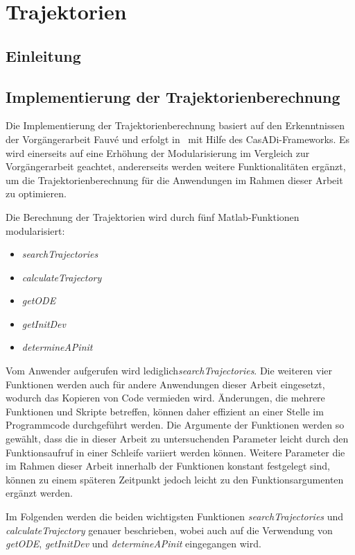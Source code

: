 \chapter{Trajektorien}\label{cha:trj}

\section{Einleitung}

\section{Implementierung der Trajektorienberechnung}

Die Implementierung der Trajektorienberechnung basiert auf den Erkenntnissen der Vorgängerarbeit Fauvé \cite{fauve} und erfolgt in \Matlab\ mit Hilfe des CasADi-Frameworks. Es wird einerseits auf eine Erhöhung der Modularisierung im Vergleich zur Vorgängerarbeit geachtet, andererseits werden weitere Funktionalitäten ergänzt, um die Trajektorienberechnung für die Anwendungen im Rahmen dieser Arbeit zu optimieren.

Die Berechnung der Trajektorien wird durch fünf Matlab-Funktionen modularisiert:
\begin{itemize}
	\item \textit{searchTrajectories}
	\item \textit{calculateTrajectory}
	\item \textit{getODE}
	\item \textit{getInitDev}
	\item \textit{determineAPinit}
\end{itemize}

Vom Anwender aufgerufen wird lediglich\textit{searchTrajectories}. Die weiteren vier Funktionen werden auch für andere Anwendungen dieser Arbeit eingesetzt, wodurch das Kopieren von Code vermieden wird. Änderungen, die mehrere Funktionen und Skripte betreffen, können daher effizient an einer Stelle im Programmcode durchgeführt werden. Die Argumente der Funktionen werden so gewählt, dass die in dieser Arbeit zu untersuchenden Parameter leicht durch den Funktionsaufruf in einer Schleife variiert werden können. Weitere Parameter die im Rahmen dieser Arbeit innerhalb der Funktionen konstant festgelegt sind, können zu einem späteren Zeitpunkt jedoch leicht zu den Funktionsargumenten ergänzt werden.

Im Folgenden werden die beiden wichtigsten Funktionen \textit{searchTrajectories} und \textit{calculateTrajectory} genauer beschrieben, wobei auch auf die Verwendung von \textit{getODE}, \textit{getInitDev} und \textit{determineAPinit} eingegangen wird.




